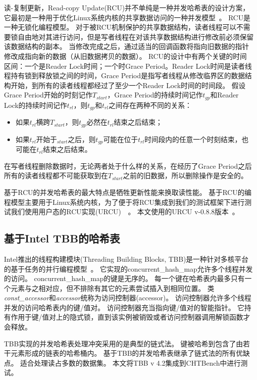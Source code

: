 读-复制更新，Read-copy Update(RCU)并不单纯是一种并发哈希表的设计方案，它最初是一种用于优化Linux系统内核的共享数据访问的一种并发模型~\cite{rcu}。
RCU是一种无锁化编程模型。
对于被RCU机制保护的共享数据结构，读者线程可以不需要锁自由地对其进行访问，但是写者线程在对该共享数据结构进行修改前必须保留该数据结构的副本。
当修改完成之后，通过适当的回调函数将指向旧数据的指针修改成指向新的数据（从旧数据拷贝的数据）。
RCU的设计中有两个关键的时间区间：一个是Reader Lock时间；一个时Grace Period。Reader Lock时间是读者线程持有锁到释放锁之间的时间，Grace Period是指写者线程从修改临界区的数据结构开始，到所有的读者线程都经过了至少一个Reader Lock时间的时间段。
假设Grace Period开始的时刻记作$T_{start}$，Grace Period的持续时间记作$t_{gp}$和Reader Lock的持续时间记作$t_{rl}$，则$t_{gp}$和$t_{rl}$之间存在两种不同的关系：
\begin{itemize}
  \item 如果$t_{rl}$横跨$T_{start}$，则$t_{gp}$必然在$t_{rl}$结束之后结束；
  \item 如果$t_{rl}$开始于$_{start}$之后，则$t_{gp}$可能在位于$t_{rl}$时间段内的任意一个时刻结束，也可能在$t_{rl}$结束之后结束。
\end{itemize}
在写者线程删除数据时，无论两者处于什么样的关系，在经历了Grace Period之后所有的读者线程都不可能获取到在$T_{start}$之前的旧数据，所以删除操作是安全的。

基于RCU的并发哈希表的最大特点是牺牲更新性能来换取读性能。
基于RCU的编程模型主要用于Linux系统内核，为了便于将RCU集成到我们的测试框架下进行测试我们使用用户态的RCU实现(URCU)~\cite{urcu}~。
本文使用的URCU v-0.8.8版本~\cite{urcucode}。

\subsection{基于Intel TBB的哈希表}

Intel推出的线程构建模块(Threading Building Blocks, TBB)是一种针对多核平台的基于任务的并行编程模型~\cite{tbb}。
它实现的concurrent\_hash\_map允许多个线程并发的访问。
concurrent\_hash\_map的键是无序的。
每一个键在哈希表内最多只有一个元素与之相对应，但不排除有其它的元素尝试插入到相同位置。
类\textit{const\_accessor}和\textit{accessor}统称为访问控制器(accessor)。
访问控制器允许多个线程并发的访问哈希表内的键/值对。
访问控制器充当指向键/值对的智能指针。
它持有作用于键/值对上的隐式锁，直到该实例被销毁或者访问控制器调用解锁函数才会释放。

TBB实现的并发哈希表处理冲突采用的是典型的链式法。
键被哈希到包含了由若干元素形成的链表的哈希桶内。
基于TBB的并发哈希表继承了链式法的所有优缺点。
适合处理读占多数的数据集。
本文将TBB v 4.2集成到CHTBench中进行测试。

